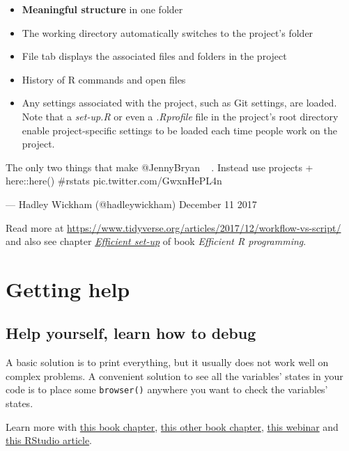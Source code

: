 \documentclass[]{book}
\providecommand{\tightlist}{%
  \setlength{\itemsep}{0pt}\setlength{\parskip}{0pt}}
\theoremstyle{definition}
\theoremstyle{definition}
\theoremstyle{definition}
\theoremstyle{remark}
\begin{document}
\begin{itemize}
  \begin{itemize}
  \tightlist
  \item
    \textbf{Meaningful structure} in one folder
  \item
    The working directory automatically switches to the project's folder
  \item
    File tab displays the associated files and folders in the project
  \item
    History of R commands and open files
  \item
    Any settings associated with the project, such as Git settings, are
    loaded. Note that a \emph{set-up.R} or even a \emph{.Rprofile} file
    in the project's root directory enable project-specific settings to
    be loaded each time people work on the project.
  \end{itemize}
\end{itemize}

The only two things that make @JennyBryan 😤😠🤯. Instead use projects +
here::here() \#rstats pic.twitter.com/GwxnHePL4n

--- Hadley Wickham (@hadleywickham) December 11 2017

Read more at
\url{https://www.tidyverse.org/articles/2017/12/workflow-vs-script/} and
also see chapter
\href{https://bookdown.org/csgillespie/efficientR/set-up.html}{\emph{Efficient
set-up}} of book \emph{Efficient R programming}.

\section{Getting help}\label{getting-help}

\subsection{Help yourself, learn how to
debug}\label{help-yourself-learn-how-to-debug}

A basic solution is to print everything, but it usually does not work
well on complex problems. A convenient solution to see all the
variables' states in your code is to place some \texttt{browser()}
anywhere you want to check the variables' states.

Learn more with
\href{https://bookdown.org/rdpeng/rprogdatascience/debugging.html}{this
book chapter},
\href{http://adv-r.had.co.nz/Exceptions-Debugging.html}{this other book
chapter},
\href{https://www.rstudio.com/resources/videos/debugging-techniques-in-rstudio/}{this
webinar} and
\href{https://support.rstudio.com/hc/en-us/articles/205612627-Debugging-with-RStudio}{this
RStudio article}.
\end{document}
